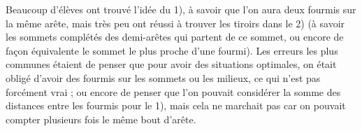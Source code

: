 Beaucoup d'élèves ont trouvé l'idée du 1), à savoir que l'on aura deux fourmis sur la même arête, mais très peu ont réussi à trouver les tiroirs dans le 2) (à savoir les sommets complétés des demi-arêtes qui partent de ce sommet, ou encore de façon équivalente le sommet le plus proche d'une fourmi). Les erreurs les plus communes étaient de penser que pour avoir des situations optimales, on était obligé d'avoir des fourmis sur les sommets ou les milieux, ce qui n'est pas forcément vrai ; ou encore de penser que l'on pouvait considérer la somme des distances entre les fourmis pour le 1), mais cela ne marchait pas car on pouvait compter plusieurs fois le même bout d'arête.